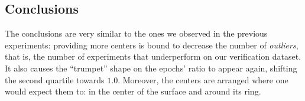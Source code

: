 \documentclass[12pt]{report} %
\begin{document}

\subsection*{Conclusions}

The conclusions are very similar to the ones we observed in the previous experiments: providing
more centers is bound to decrease the number of \textit{outliers}, that is, the number of
experiments that underperform on our verification dataset. It also causes the
``trumpet'' shape on the epochs' ratio to appear again, shifting the second quartile towards
$1.0$. Moreover, the centers are arranged
where one would expect them to: in the center of the surface and around its ring.
\end{document}
